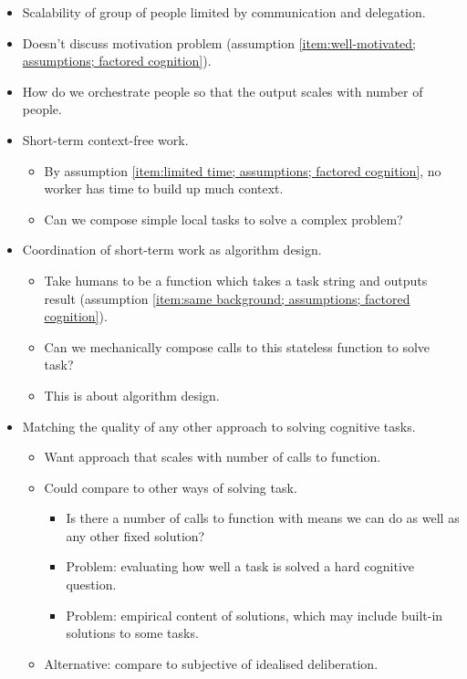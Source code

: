 \begin{itemize}
\begin{itemize}
        \item Scalability of group of people limited by communication and delegation.
        \item Doesn't discuss motivation problem (assumption \ref{item:well-motivated; assumptions; factored cognition}).
        \item How do we orchestrate people so that the output scales with number of people.
        \item Short-term context-free work.
        \begin{itemize}
            \item By assumption \ref{item:limited time; assumptions; factored cognition}, no worker has time to build up much context.
            \item Can we compose simple local tasks to solve a complex problem?
        \end{itemize}
        \item Coordination of short-term work as algorithm design.
        \begin{itemize}
            \item Take humans to be a function which takes a task string and outputs result (assumption \ref{item:same background; assumptions; factored cognition}).
            \item Can we mechanically compose calls to this stateless function to solve task?
            \item This is about algorithm design.
        \end{itemize}
        \item Matching the quality of any other approach to solving cognitive tasks.
        \begin{itemize}
            \item Want approach that scales with number of calls to function.
            \item Could compare to other ways of solving task.
            \begin{itemize}
                \item Is there a number of calls to function with means we can do as well as any other fixed solution?
                \item Problem: evaluating how well a task is solved a hard cognitive question.
                \item Problem: empirical content of solutions, which may include built-in solutions to some tasks.
            \end{itemize}
            \item Alternative: compare to subjective of idealised deliberation.

\end{itemize}
\end{itemize}
\end{itemize}
